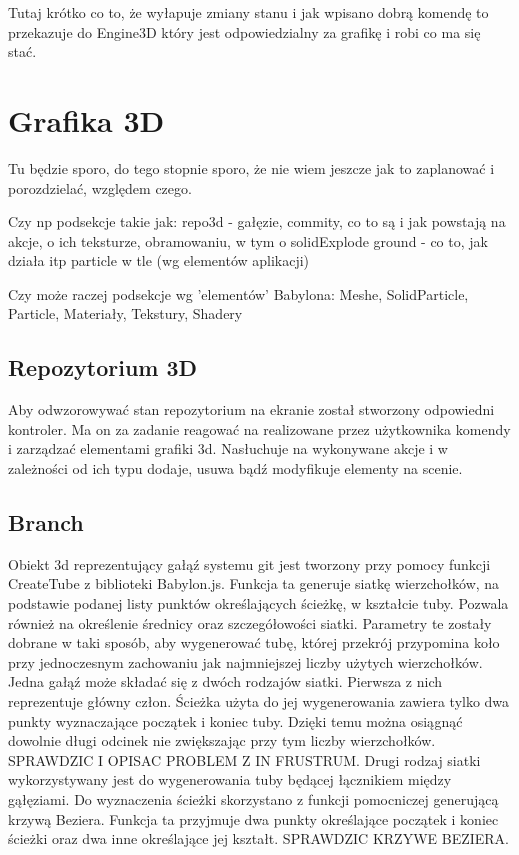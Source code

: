 \documentclass[11pt,a4paper,polish,thesis]{dcsbook}
\begin{document}
	Tutaj krótko co to, że wyłapuje zmiany stanu i jak wpisano dobrą komendę to przekazuje do Engine3D który jest odpowiedzialny za grafikę i robi co ma się stać.
	
	\section{Grafika 3D}
	Tu będzie sporo, do tego stopnie sporo, że nie wiem jeszcze jak to zaplanować i porozdzielać, względem czego.
	
	Czy np podsekcje takie jak:
	repo3d - gałęzie, commity, co to są i jak powstają na akcje, o ich teksturze, obramowaniu, w tym o solidExplode
	ground - co to, jak działa itp
	particle w tle
	(wg elementów aplikacji)
	
	Czy może raczej podsekcje wg 'elementów' Babylona:
	Meshe, SolidParticle, Particle, Materiały, Tekstury, Shadery
	
	

	\subsection{Repozytorium 3D}
		Aby odwzorowywać stan repozytorium na ekranie został stworzony odpowiedni kontroler. Ma on za zadanie reagować na realizowane przez użytkownika komendy i zarządzać elementami grafiki 3d. Nasłuchuje na wykonywane akcje i w zależności od ich typu dodaje, usuwa bądź modyfikuje elementy na scenie. 

	\subsection{Branch}
	Obiekt 3d reprezentujący gałąź systemu git jest tworzony przy pomocy funkcji CreateTube z biblioteki Babylon.js. 
Funkcja ta generuje siatkę wierzchołków, na podstawie podanej listy punktów określających ścieżkę, w kształcie tuby. Pozwala również na określenie średnicy oraz
szczegółowości siatki. Parametry te zostały dobrane w taki sposób, aby wygenerować tubę, której przekrój przypomina koło przy jednoczesnym zachowaniu jak najmniejszej liczby użytych wierzchołków. Jedna gałąź może składać się z dwóch rodzajów siatki. Pierwsza z nich reprezentuje główny człon. Ścieżka użyta do jej wygenerowania zawiera tylko dwa punkty wyznaczające początek i koniec tuby. Dzięki temu można osiągnąć dowolnie długi odcinek nie zwiększając przy tym liczby wierzchołków. SPRAWDZIC I OPISAC PROBLEM Z IN FRUSTRUM. Drugi rodzaj siatki wykorzystywany jest do wygenerowania tuby będącej łącznikiem między gąłęziami. Do wyznaczenia ścieżki skorzystano z funkcji pomocniczej generującą krzywą Beziera. Funkcja ta przyjmuje dwa punkty określające początek i koniec ścieżki oraz dwa inne określające jej kształt. SPRAWDZIC KRZYWE BEZIERA. 
\end{document}
